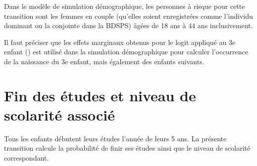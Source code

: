 \documentclass[letterpaper,10pt,french]{sphinxmanual}
\begin{document}
Dans le modèle de simulation démographique, les personnes à risque pour cette transition sont les femmes en couple (qu’elles soient enregistrées comme l’individu dominant ou la conjointe dans la BDSPS) âgées de 18 ans à 44 ans inclusivement.

Il faut préciser que les effets marginaux obtenus pour le logit appliqué au 3e enfant () est utilisé dans la simulation démographique pour calculer l’occurrence de la naissance du 3e enfant, mais également des enfants suivants.


\section{Fin des études et niveau de scolarité associé}
\label{\detokenize{transition_models:fin-des-etudes-et-niveau-de-scolarite-associe}}
Tous les enfants débutent leurs études l’année de leurs 5 ans. La présente transition calcule la probabilité de finir ses études ainsi que le niveau de scolarité correspondant.
\end{document}
